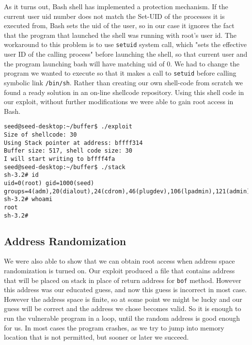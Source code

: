 \documentclass[12pt, a4paper, pdflatex]{article}
\begin{document}
As it turns out, Bash shell has implemented a protection mechanism. If the current user uid number does not match the Set-UID of the processes it is executed from, Bash sets the uid of the user, so in our case it ignores the fact that the program that launched the shell was running with root's user id. The workaround to this problem is to use \texttt{setuid} system call, which "sets the effective user ID of the calling process"\cite{setuidman} before launching the shell, so that current user and the program launching bash will have matching uid of 0. We had to change the program we wanted to execute so that it makes a call to \texttt{setuid} before calling symbolic link \texttt{/bin/sh}. Rather than creating our own shell-code from scratch we found a ready solution in an on-line shellcode repository\cite{shellstorm}. Using this shell code in our exploit, without further modifications we were able to gain root access in Bash.

\vspace{1em}
\lstset{
	captionpos=b,
	frame=single,
	language=BASH,
	breaklines=true,
	caption=Function with buffer overflow vulnerability,
	label=bof:root2,
  float=tb
}
\begin{lstlisting}
seed@seed-desktop:~/buffer$ ./exploit 
Size of shellcode: 30
Using Stack pointer at address: bffff314
Buffer size: 517, shell code size: 30
I will start writing to bffff4fa
seed@seed-desktop:~/buffer$ ./stack 
sh-3.2# id
uid=0(root) gid=1000(seed) groups=4(adm),20(dialout),24(cdrom),46(plugdev),106(lpadmin),121(admin),122(sambashare),1000(seed)
sh-3.2# whoami
root
sh-3.2# 
\end{lstlisting}

\subsection{Address Randomization}

We were also able to show that we can obtain root access when address space randomization is turned on. Our exploit produced a file that contains address that will be placed on stack in place of return address for \texttt{bof} method. However this address was our educated guess, and now this guess is incorrect in most case. However the address space is finite, so at some point we might be lucky and our guess will be correct and the address we chose becomes valid. So it is enough to run the vulnerable program in a loop, until the random address is good enough for us. In most cases the program crashes, as we try to jump into memory location that is not permitted, but sooner or later we succeed.
\end{document}
